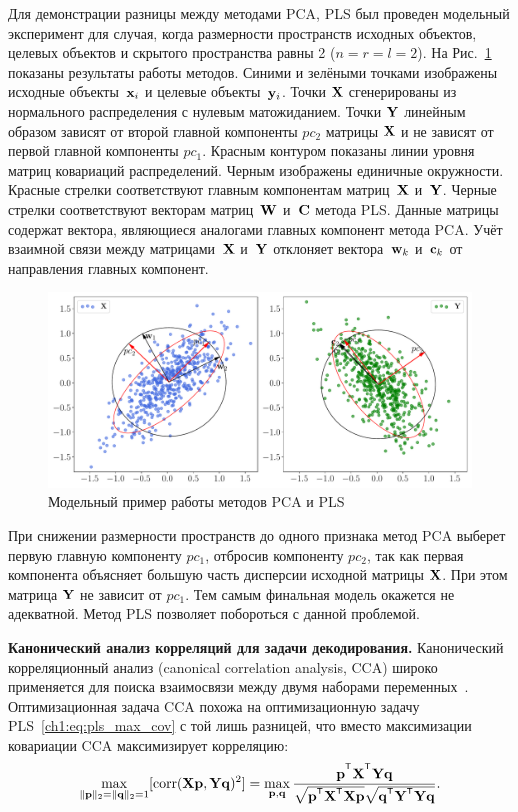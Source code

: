 Для демонстрации разницы между методами PCA, PLS был проведен модельный эксперимент для случая, когда размерности пространств исходных объектов, целевых объектов и скрытого пространства равны 2 ($n = r = l = 2$).
На Рис.~\ref{ch1:fig:pls_toy_example} показаны результаты работы методов. 
Синими и зелёными точками изображены исходные объекты~$\mathbf{x}_i$ и целевые объекты~$\mathbf{y}_i$. 
Точки $\mathbf{X}$ сгенерированы из нормального распределения с нулевым матожиданием. 
Точки $\mathbf{Y}$ линейным образом зависят от второй  главной компоненты $pc_2$ матрицы $\mathbf{X}$ и не зависят от первой главной компоненты $pc_1$.
Красным контуром показаны линии уровня матриц ковариаций распределений. 
Черным изображены единичные окружности. 
Красные стрелки соответствуют главным компонентам матриц~$\mathbf{X}$ и~$\mathbf{Y}$. 
Черные стрелки соответствуют векторам матриц~$\mathbf{W}$ и~$\mathbf{C}$ метода PLS. 
Данные матрицы содержат вектора, являющиеся аналогами главных компонент метода PCA.
Учёт взаимной связи между матрицами~$\mathbf{X}$ и~$\mathbf{Y}$ отклоняет вектора~$\mathbf{w}_k$ и~$\mathbf{c}_k$ от направления главных компонент. 
\begin{figure}[h]
	\centering
	\includegraphics[width=\linewidth]{figs/ch1/pls_toy_example}
	\caption{Модельный пример работы методов PCA и PLS}
	\label{ch1:fig:pls_toy_example}
\end{figure}

При снижении размерности пространств до одного признака метод PCA выберет первую главную компоненту $pc_1$, отбросив компоненту $pc_2$, так как первая компонента объясняет большую часть дисперсии исходной матрицы $\mathbf{X}$. 
При этом матрица $\mathbf{Y}$ не зависит от $pc_1$. 
Тем самым финальная модель окажется не адекватной.
Метод PLS позволяет побороться с данной проблемой.

\vspace{0.5cm}
\textbf{Канонический анализ корреляций для задачи декодирования.}
Канонический корреляционный анализ (canonical correlation analysis, CCA) широко применяется для поиска взаимосвязи между двумя наборами переменных~\cite{hotelling1992relations,anderson1962introduction}. 
Оптимизационная задача CCA похожа на оптимизационную задачу PLS~\eqref{ch1:eq:pls_max_cov} с той лишь разницей, что вместо максимизации ковариации CCA максимизирует корреляцию:
\begin{equation}
	\max_{\|\bp\|_{2}=\|\bq\|_{2}=1}[ \text{corr}(\bX \bp, \bY \bq)^{2}] = \max_{\bp, \bq} \frac{\bp^{\T} \bX^{\T} \bY \bq}{\sqrt{\bp^{\T} \bX^{\T}  \bX \bp} \sqrt{\bq^{\T} \bY^{\T}  \bY\bq}}.
	\label{ch1:eq:cca_max_corr}
\end{equation}

